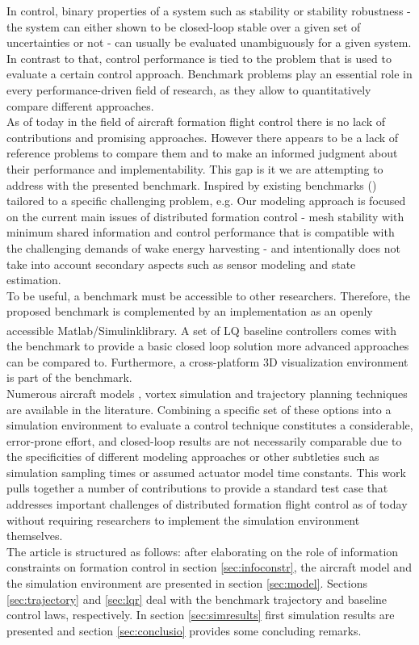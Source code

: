 \documentclass{ifacconf}
\newcommand{\Matlabbrand}{Matlab\textsuperscript{\tiny{\textregistered}}}
\newcommand{\Simulinkbrand}{Simulink\textsuperscript{\tiny{\textregistered}}}
\begin{document}
In control, binary properties of a system such as stability or stability robustness - the system can either shown to be closed-loop stable over a given set of uncertainties or not - can usually be evaluated unambiguously for a given system. In contrast to that, control performance is tied to the problem that is used to evaluate a certain control approach. 
Benchmark problems play an essential role in every performance-driven field of research, as they allow to quantitatively compare different approaches. \\
As of today in the field of aircraft formation flight control there is no lack of contributions and promising approaches. However there appears to be a lack of reference problems to compare them and to make an informed judgment about their performance and implementability. This gap is it we are attempting to address with the presented benchmark. Inspired by existing benchmarks (\cite{biannic2015flare}) tailored to a specific challenging problem, e.g. Our modeling approach is focused on the current main issues of distributed formation control - mesh stability with minimum shared information and control performance that is compatible with the challenging demands of wake energy harvesting - and intentionally does not take into account secondary aspects such as sensor modeling and state estimation.\\
To be useful, a benchmark must be accessible to other researchers. Therefore, the proposed benchmark is complemented by an implementation as an openly accessible \Matlabbrand/\Simulinkbrand library. A set of LQ baseline controllers comes with the benchmark to provide a basic closed loop solution more advanced approaches can be compared to.
Furthermore, a cross-platform 3D visualization environment is part of the benchmark. \\
Numerous aircraft models \cite{Beard2012}, vortex simulation \cite{Dogan2008b,Saban2009} and trajectory planning techniques are available in the literature. Combining a specific set of these options into a simulation environment to evaluate a control technique constitutes a considerable, error-prone effort, and closed-loop results are not necessarily comparable due to the specificities of different modeling approaches or other subtleties such as simulation sampling times or assumed actuator model time constants. 
This work pulls together a number of contributions to provide a standard test case that addresses important challenges of distributed formation flight control as of today without requiring researchers to implement the simulation environment themselves.\\
The article is structured as follows: after elaborating on the role of information constraints on formation control in section \ref{sec:infoconstr}, the aircraft model and the simulation environment are presented in section \ref{sec:model}. Sections \ref{sec:trajectory} and \ref{sec:lqr} deal with the benchmark trajectory and baseline control laws, respectively. In section \ref{sec:simresults} first simulation results are presented and section \ref{sec:conclusio} provides some concluding remarks.
%
\end{document}
